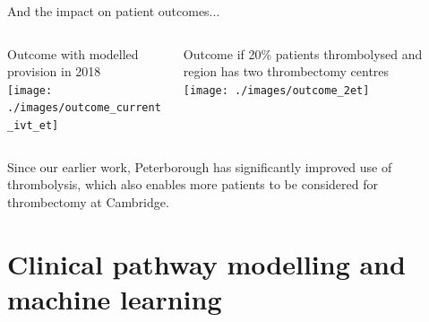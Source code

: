 \documentclass{beamer}
\begin{document}
\begin{frame}{And the impact on patient outcomes...}
\begin{footnotesize}
    


\begin{columns}[b]
    \begin{column}{0.5\textwidth}
        \begin{center}
        Outcome with modelled provision in 2018\\
        \vspace{3mm}
        \texttt{[image: ./images/outcome\_current\_ivt\_et]}
        \end{center}        
    \end{column}
    
    \begin{column}{0.5\textwidth}
        \begin{center}
        Outcome if 20\% patients thrombolysed and region has two thrombectomy centres\\        
        \vspace{3mm}
        \texttt{[image: ./images/outcome\_2et]}
        \end{center}   
    
    \end{column}
\end{columns}

\vspace{3mm}
Since our earlier work, Peterborough has significantly improved use of thrombolysis, which also enables more patients to be considered for thrombectomy at Cambridge.

\end{footnotesize}
\end{frame}


\section{Clinical pathway modelling and machine learning}

\end{document}
